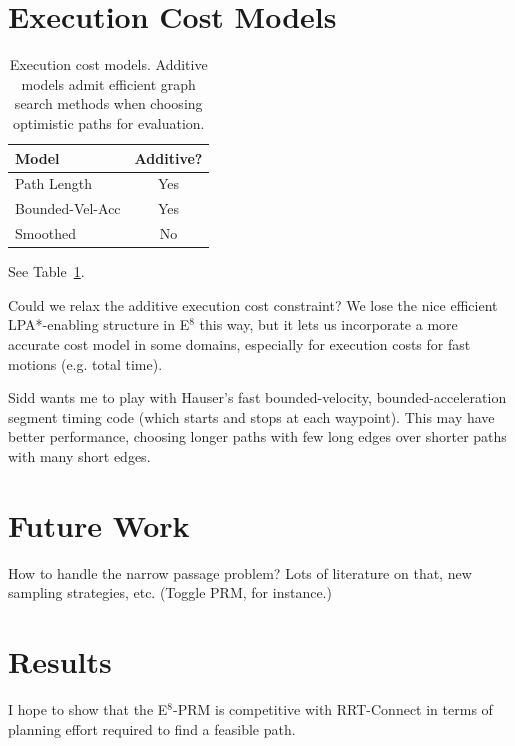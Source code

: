 \section{Execution Cost Models}

\begin{table}
   \centering
   \begin{tabular}{lc}
      \toprule
      Model & Additive? \\
      \midrule
      Path Length & Yes \\
      Bounded-Vel-Acc & Yes \\
      Smoothed & No \\
      \bottomrule
   \end{tabular}
   \caption{Execution cost models.
      Additive models admit efficient graph search methods
      when choosing optimistic paths for evaluation.}
   \label{table:exec-cost-models}
\end{table}

See Table~\ref{table:exec-cost-models}.

Could we relax the additive execution cost constraint?
We lose the nice efficient LPA*-enabling structure in
E$^8$ this way,
but it lets us incorporate a more accurate cost model in some domains,
especially for execution costs for fast motions (e.g. total time).

Sidd wants me to play with Hauser's fast bounded-velocity,
bounded-acceleration segment timing code
(which starts and stops at each waypoint).
This may have better performance,
choosing longer paths with few long edges over
shorter paths with many short edges.

\section{Future Work}

How to handle the narrow passage problem?
Lots of literature on that, new sampling strategies, etc.
(Toggle PRM, for instance.)

\section{Results}

I hope to show that the E$^8$-PRM is competitive with RRT-Connect
in terms of planning effort required to find a feasible path.

